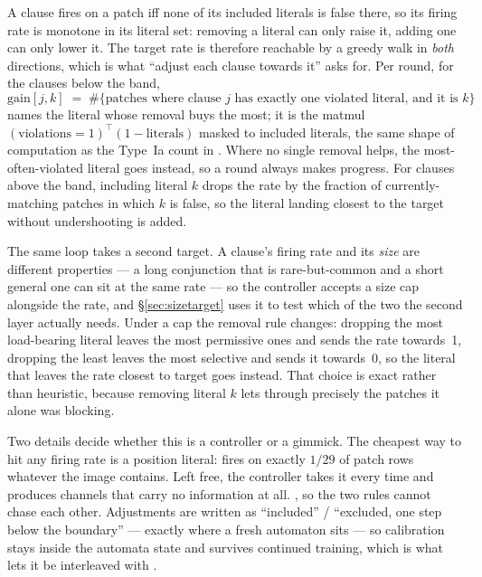 A clause fires on a patch iff none of its included literals is false there, so its firing rate
is monotone in its literal set: removing a literal can only raise it, adding one can only lower
it. The target rate is therefore reachable by a greedy walk in \emph{both} directions, which is
what ``adjust each clause towards it'' asks for. Per round, for the clauses below the band,
\[
  \mathrm{gain}[j,k] \;=\; \#\{\text{patches where clause $j$ has exactly one violated literal,
  and it is $k$}\}
\]
names the literal whose removal buys the most; it is the matmul $(\text{violations}=1)^{\!\top}
(1-\text{literals})$ masked to included literals, the same shape of computation as the Type~Ia
count in . Where no single removal helps, the most-often-violated literal goes
instead, so a round always makes progress. For clauses above the band, including literal $k$
drops the rate by the fraction of currently-matching patches in which $k$ is false, so the
literal landing closest to the target without undershooting is added.

The same loop takes a second target. A clause's firing rate and its \emph{size} are different
properties --- a long conjunction that is rare-but-common and a short general one can sit at
the same rate --- so the controller accepts a size cap alongside the rate, and
\S\ref{sec:sizetarget} uses it to test which of the two the second layer actually needs.
Under a cap the removal rule changes: dropping the most load-bearing literal leaves the most
permissive ones and sends the rate towards~1, dropping the least leaves the most selective and
sends it towards~0, so the literal that leaves the rate closest to target goes instead. That
choice is exact rather than heuristic, because removing literal $k$ lets through precisely the
patches it alone was blocking.

Two details decide whether this is a controller or a gimmick.  The cheapest way to hit any firing rate is a position literal:
 fires on exactly $1/29$ of patch rows whatever the image contains. Left free, the
controller takes it every time and produces channels that carry no information at all.
, so the two rules cannot chase
each other. Adjustments are written as ``included'' / ``excluded, one step below the
boundary'' --- exactly where a fresh automaton sits --- so calibration stays inside the
automata state and survives continued training, which is what lets it be interleaved with
\ideaC.

